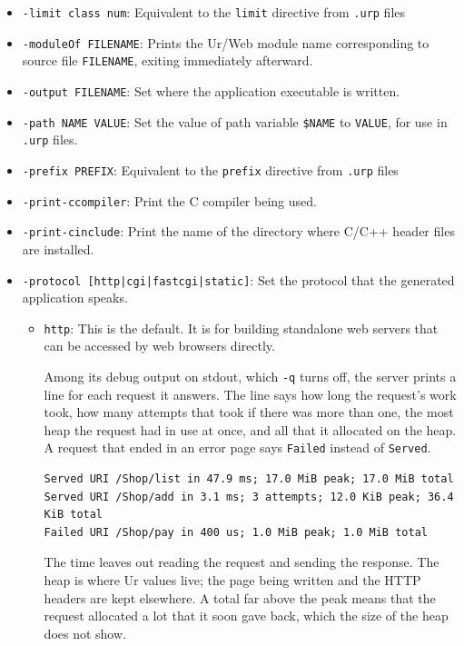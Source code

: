 \documentclass{article}
\begin{document}
\begin{itemize}
\item \texttt{-limit class num}: Equivalent to the \texttt{limit} directive from \texttt{.urp} files

\item \texttt{-moduleOf FILENAME}: Prints the Ur/Web module name corresponding to source file \texttt{FILENAME}, exiting immediately afterward.

\item \texttt{-output FILENAME}: Set where the application executable is written.

\item \texttt{-path NAME VALUE}: Set the value of path variable \texttt{\$NAME} to \texttt{VALUE}, for use in \texttt{.urp} files.

\item \texttt{-prefix PREFIX}: Equivalent to the \texttt{prefix} directive from \texttt{.urp} files

\item \texttt{-print-ccompiler}: Print the C compiler being used.

\item \texttt{-print-cinclude}: Print the name of the directory where C/C++ header files are installed.

\item \texttt{-protocol [http|cgi|fastcgi|static]}: Set the protocol that the generated application speaks.
  \begin{itemize}
  \item \texttt{http}: This is the default.  It is for building standalone web servers that can be accessed by web browsers directly.

    Among its debug output on stdout, which \texttt{-q} turns off, the server prints a line for each request it answers.  The line says how long the request's work took, how many attempts that took if there was more than one, the most heap the request had in use at once, and all that it allocated on the heap.  A request that ended in an error page says \texttt{Failed} instead of \texttt{Served}.
    \begin{verbatim}
Served URI /Shop/list in 47.9 ms; 17.0 MiB peak; 17.0 MiB total
Served URI /Shop/add in 3.1 ms; 3 attempts; 12.0 KiB peak; 36.4 KiB total
Failed URI /Shop/pay in 400 us; 1.0 MiB peak; 1.0 MiB total
    \end{verbatim}
    The time leaves out reading the request and sending the response.  The heap is where Ur values live; the page being written and the HTTP headers are kept elsewhere.  A total far above the peak means that the request allocated a lot that it soon gave back, which the size of the heap does not show.



\end{itemize}
\end{itemize}
\end{document}
